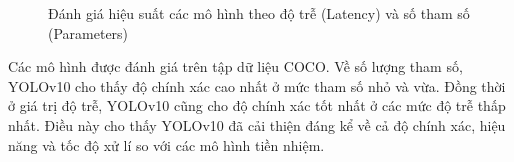 \begin{figure}[H]
    \centering
    \quad %
    \caption{Đánh giá hiệu suất các mô hình theo độ trễ (Latency) và số tham số (Parameters)}
    \label{fig:multiple_images}
\end{figure}

Các mô hình được đánh giá trên tập dữ liệu COCO. Về số lượng tham số, YOLOv10 cho thấy độ chính xác cao nhất ở mức tham số nhỏ và vừa. Đồng thời ở giá trị độ trễ, YOLOv10 cũng cho độ chính xác tốt nhất ở các mức độ trễ thấp nhất. Điều này cho thấy YOLOv10 đã cải thiện đáng kể về cả độ chính xác, hiệu năng và tốc độ xử lí so với các mô hình tiền nhiệm. 